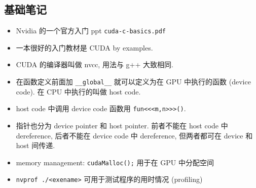 

\subsection{基础笔记}
\begin{itemize}
\item Nvidia 的一个官方入门 ppt \verb|cuda-c-basics.pdf|
\item 一本很好的入门教材是 CUDA by examples.
\item CUDA 的编译器叫做 nvcc, 用法与 g++ 大致相同.
\item 在函数定义前面加 \verb`__global__` 就可以定义为在 GPU 中执行的函数 (device code). 在 CPU 中执行的叫做 host code.
\item host code 中调用 device code 函数用 \verb`fun<<<m,n>>>()`.
\item 指针也分为 device pointer 和 host pointer. 前者不能在 host code 中 dereference, 后者不能在 device code 中 dereference, 但两者都可在 device 和 host 间传递.
\item memory management:
\verb`cudaMalloc();` 用于在 GPU 中分配空间
\item \verb`nvprof ./<exename>` 可用于测试程序的用时情况 (profiling)
\end{itemize}

